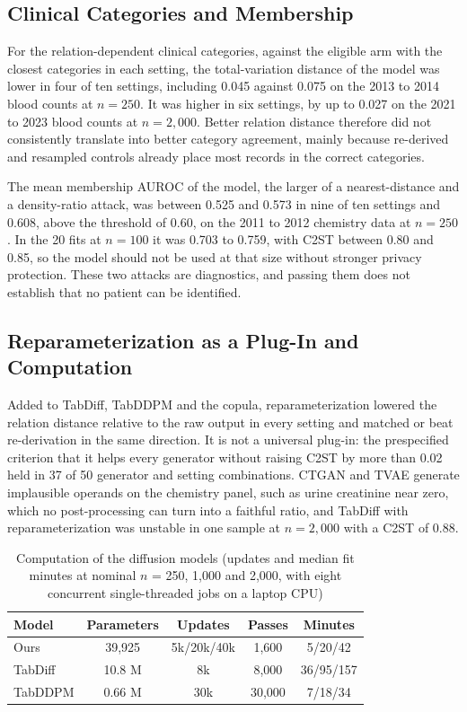 \documentclass[conference]{IEEEtran}
\begin{document}
\subsection{Clinical Categories and Membership}

For the relation-dependent clinical categories, against the eligible arm with the closest categories in each setting, the total-variation distance of the model was lower in four of ten settings, including 0.045 against 0.075 on the 2013 to 2014 blood counts at $n = 250$. It was higher in six settings, by up to 0.027 on the 2021 to 2023 blood counts at $n = 2{,}000$. Better relation distance therefore did not consistently translate into better category agreement, mainly because re-derived and resampled controls already place most records in the correct categories.

The mean membership AUROC of the model, the larger of a nearest-distance and a density-ratio attack, was between 0.525 and 0.573 in nine of ten settings and 0.608, above the threshold of 0.60, on the 2011 to 2012 chemistry data at $n = 250$. In the 20 fits at $n = 100$ it was 0.703 to 0.759, with C2ST between 0.80 and 0.85, so the model should not be used at that size without stronger privacy protection. These two attacks are diagnostics, and passing them does not establish that no patient can be identified.

\subsection{Reparameterization as a Plug-In and Computation}

Added to TabDiff, TabDDPM and the copula, reparameterization lowered the relation distance relative to the raw output in every setting and matched or beat re-derivation in the same direction. It is not a universal plug-in: the prespecified criterion that it helps every generator without raising C2ST by more than 0.02 held in 37 of 50 generator and setting combinations. CTGAN and TVAE generate implausible operands on the chemistry panel, such as urine creatinine near zero, which no post-processing can turn into a faithful ratio, and TabDiff with reparameterization was unstable in one sample at $n = 2{,}000$ with a C2ST of 0.88.

\begin{table}[t]
\caption{Computation of the diffusion models (updates and median fit minutes at nominal $n$ = 250, 1,000 and 2,000, with eight concurrent single-threaded jobs on a laptop CPU)}
\label{tab:compute}
\centering
\setlength{\tabcolsep}{2.5pt}
\begin{tabular}{lcccc}
\toprule
Model & Parameters & Updates & Passes & Minutes \\
\midrule
Ours & 39,925 & 5k/20k/40k & 1,600 & 5/20/42 \\
TabDiff & 10.8 M & 8k & 8,000 & 36/95/157 \\
TabDDPM & 0.66 M & 30k & 30,000 & 7/18/34 \\
\bottomrule
\end{tabular}
\end{table}
\end{document}
